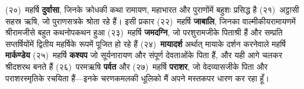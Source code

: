 \begin{sloppypar}\justifying{}
(२०)~महर्षि \textbf{दुर्वासा}, जिनके क्रोधकी कथा रामायण, महाभारत और पुराणोंमें बहुशः प्रसिद्ध है (२१)~अट्ठासी सहस्र ऋषि, जो पुराणसत्रके श्रोता रहे हैं। इसी प्रकार (२२)~महर्षि \textbf{जाबालि}, जिनका वाल्मीकीय\-रामायणमें श्रीरामजीसे बहुत कथनोपकथन हुआ (२३)~महर्षि \textbf{जमदग्नि}, जो परशुरामजीके पिताश्री हैं और सम्प्रति सप्तर्षियोंमें द्वितीय महर्षिके रूपमें पूजित हो रहे हैं (२४)~\textbf{मायादर्श} अर्थात् मायाके दर्शन करनेवाले महर्षि \textbf{मार्कण्डेय} (२५)~महर्षि \textbf{कश्यप} जो सूर्यनारायण और संपूर्ण देवताओंके पिता हैं, और यही आगे चलकर श्रीदशरथ बनते हैं (२६)~परमऋषि \textbf{पर्वत} और (२७)~महर्षि \textbf{पराशर}, जो वेदव्यासजीके पिता और पराशरस्मृतिके रचयिता हैं—इनके चरणकमलकी धूलिको मैं अपने मस्तकपर धारण कर रहा हूँ।
\end{sloppypar}


